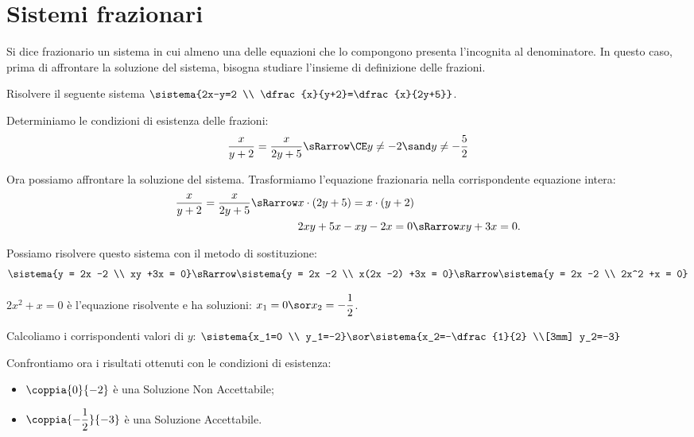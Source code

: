 
\section{Sistemi frazionari}
\label{sec:sist2gr_sistemifrazionari}

Si dice frazionario un sistema in cui almeno una delle equazioni che lo 
compongono presenta l'incognita al denominatore.
In questo caso, prima di affrontare la soluzione del sistema, bisogna 
studiare l'insieme di definizione delle frazioni.

\begin{esempio}{}{}
Risolvere il seguente sistema 
\(\sistema{2x-y=2 \\ \dfrac{x}{y+2}=\dfrac{x}{2y+5}}\).

\pagebreak %
\medskip
Determiniamo le condizioni di esistenza delle frazioni:\\ [-.5em]
\[\dfrac{x}{y+2}=\dfrac{x}{2y+5} \sRarrow 
\CE y \neq -2 \sand y \neq -\dfrac{5}{2}\]

Ora possiamo affrontare la soluzione del sistema. 
Trasformiamo l'equazione frazionaria nella corrispondente equazione intera:
\begin{align*}
\dfrac{x}{y+2}=\dfrac{x}{2y+5} \sRarrow & x \cdot (2y+5) = x \cdot (y+2)\\
 & 2{xy}+5x-{xy}-2x=0 \sRarrow xy+3x=0.
\end{align*}

Possiamo risolvere questo sistema con il metodo di sostituzione: 
\[\sistema{y = 2x -2 \\ xy +3x = 0}
\sRarrow \sistema{y = 2x -2 \\ x(2x -2) +3x = 0}
\sRarrow \sistema{y = 2x -2 \\ 2x^2 +x = 0}\]

\(2x^2 +x = 0\) è l'equazione risolvente e ha soluzioni: 
\(x_1 = 0 \sor x_2 = -\dfrac{1}{2}\).

\medskip
Calcoliamo i corrispondenti valori di \(y\): \quad 
\(\sistema{x_1=0 \\ y_1=-2} \sor 
\sistema{x_2=-\dfrac{1}{2} \\[3mm] y_2=-3}\)

\medskip
Confrontiamo ora i risultati ottenuti con le condizioni di esistenza:
\begin{itemize}
\item \(\coppia{0}{-2}\) è una Soluzione Non Accettabile;
\item \(\coppia{-\dfrac{1}{2}}{-3}\) è una Soluzione Accettabile.
\end{itemize}
\end{esempio}

